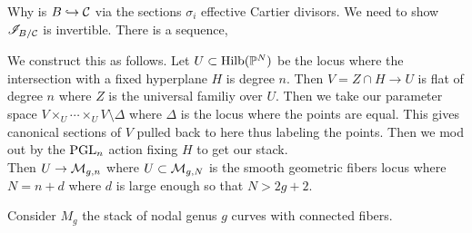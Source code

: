 \documentclass[12pt]{article}
\begin{document}
\begin{prop}
Why is $B \hookrightarrow \mathcal{C}$ via the sections $\sigma_i$ effective Cartier divisors. We need to show $\mathscr{I}_{B / \mathcal{C}}$ is invertible. There is a sequence,
\begin{center}
\end{center}
\end{prop}


We construct this as follows. Let $U \subset \mathrm{Hilb}(\mathbb{P}^N)$ be the locus where the intersection with a fixed hyperplane $H$ is degree $n$. Then $V = Z \cap H \to U$ is flat of degree $n$ where $Z$ is the universal familiy over $U$. Then we take our parameter space $V \times_U \cdots \times_U V \setminus \Delta$ where $\Delta$ is the locus where the points are equal. This gives canonical sections of $V$ pulled back to here thus labeling the points. Then we mod out by the $\mathrm{PGL}_n$ action fixing $H$ to get our stack.
\bigskip\\
Then $U \to \mathcal{M}_{g,n}$ where $U \subset \mathcal{M}_{g,N}$ is the smooth geometric fibers locus where $N = n + d$ where $d$ is large enough so that $N > 2 g + 2$. 

\begin{rmk}
Consider $M_g$ the stack of nodal genus $g$ curves with connected fibers. 
\end{rmk}  
\end{document}
